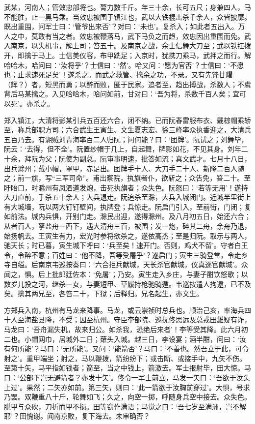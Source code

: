 \documentclass[]{article}
\begin{document}
武某，河南人；管效忠部将也。膂力数千斤。年三十余，长可五尺；身兼四人，马不能胜，止一黑马乘。当效忠被围于镇江也，武以大铁棍击杀千余人，众皆披靡。既出重围，问军士曰：`管爷出来否'？对曰：`未也'。复杀入；如此者五出入。万人之中，莫敢有当之者。效忠被鞭落马，武下马负之而趋，效忠因出重围而免。武入南京，以失机事，解上司；笞五十。及南京之战，余士信舞大刀至；武以铁扛拨开，即擒于马上。士信美仪容，布甲跣足；入京时，犹携刀乘马，武押之而行。解哈哈木，哈问曰：`汝将乎'？士信曰：`然'。哈又问：`愿为官否'？士信曰：`不愿也；止求速死足矣'！遂杀之。而武之救管、擒余之功，不录。又有先锋甘耀（辉？）者，短黑而勇；以醉而败，匿于民家。追者至，趋出搏战，杀数人；不虞背后马某擒之。入见哈哈木，哈问如前，甘对曰：`吾为将，杀数千百人矣；宜可以死'。亦杀之。

郑入镇江，大清将彭某引兵五百还六合，闭不纳。已而阮春雷服布衣、戴棕帽乘轿至，称兵部职方司；六合武生王寅生、文生夏志宏、徐三峰率众执香迎之，大清兵五百乃去。有湖贼刘青海率百二人归阮；问何能？曰：`团牌'。阮试之；刘舞毕，阮云：`去得，但不全'。阮置纱帽于几上，自起舞，牌影如花，不见其身。刘年二十余，拜阮为父；阮使为副总。阮审事明速，批答如流；真文武才。七月十八日，出兵滁州；戴小帽，罩甲，赤足出。团牌手十人、大刀手二十人、新降二百人随之；前一旗，写``三军司命''。甫出察院，执旗者仆，欲斩之；众告免，笞二十。至盱眙口，时滁州有凤泗道发炮，击死执旗者；众失色。阮怒曰：`若等无用'！遂持大刀直前，手杀五十余人；大兵退走。阮追杀至滁，大兵入城闭门。近城半里街上有大城墙，阮以两大钉钉壁间，执牌登；兵惊走。阮启门引入，至前街，门闭；复如前法。城内兵惧，开别门走。滁民出迎，遂得滁州。及八月初五日，始还六合；从者百人，拏盐舟一西下，遇大清舟三百，被围；发一炮，碎其二舟，余舟乃退，始扬帆去。王寅生有力，宏光时参将欲杀之，遂依高杰；至是归阮。取示与两人，驰天长；时已暮，寅生城下呼曰：`兵至矣！速开门。否则，鸡犬不留'。守者白王令，令醉不意；百姓曰：`他不降，吾等受屠乎'？遂启门；寅生三骑登堂，令走乡寺自缢。后南京韦巡按奏曰：`六合拒兵献城，天长杀官献城，仪真逐官献城'。众闻之，惧。后上批郎廷佐本：`免屠'；乃安。寅生走入乡庄，与妻子酣饮怒歌；以数岁儿投之河，继杀一女，与妻短甲、草履持枪驰骑遁。韦巡按遣人拘逮，已不及矣。擒其两兄至，各笞二十，下狱；后释归。兄名起生，亦文生。

方郑兵入南，杭州有马龙来降事。马龙，或云崇祯时总兵也。顺治己亥，率海兵四十人至海盐县降，不受；因至杭州。守臣李部院、巡抚佟思远及总戎田雄疑有诈，马龙曰：`吾舟漏失机，故来归公。如杀我，恐绝后来者'！李等受其降。此六月初二也。小帽网巾，居城外二日；薙头入城。越三日，李设宴；酒半酣，问曰：`汝有何所能'？马曰：`无所能'。又问：`能箭否'？马曰：`不善也。然吾立于此，可令射之'。重甲端坐；射之，马以鞭拨，箭纷纷下；或击断、或接手中，九矢不伤。至第十矢，马平指如钱者；箭至，当之中钱上，箭激去。军士报射毕，田大惊。马曰：`公部下岂无避箭者？亦发十矢'。佟令一军士前立，马发一矢曰：`吾欲于汝头上过'。果然；二矢亦如前。第三矢，则曰：`此一箭欲于汝胸前穿过'。大惧，号求乃罢。双鞭重八十斤，轮舞如飞；久之，向空一掷，呼随身兵空中接去。众失色。脱甲与众砍，刀折而甲不损。田等窃作满语；马觉之曰：`吾七岁至满洲，岂不解耶'？田愧谢。闻南京败，复下海去。未审确否？
\end{document}
